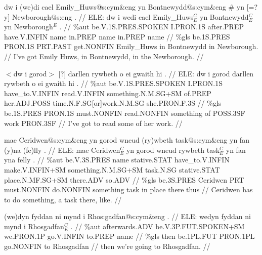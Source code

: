 \documentclass[a4paper,10pt]{article}
\begin{document}
\ex
\begingl[lingstyle=gergl]
\glchat dw i (we)di cael Emily\_Huws@s:cym\&eng yn Bontnewydd@s:cym\&eng \# yn [=? y] Newborough@s:eng . //
\glsurface ELE:  dw i wedi cael Emily\_Huws$^{C}_{E}$ yn Bontnewydd$^{C}_{E}$ yn Newborough$^{E}$ .  //
\glauto \%aut  be{\scriptsize .V.1S.PRES.SPOKEN} I{\scriptsize .PRON.1S} after{\scriptsize .PREP} have{\scriptsize .V.INFIN} name in{\scriptsize .PREP} name in{\scriptsize .PREP} name   //
\glmanual \%gls  be{\scriptsize .1S.PRES} PRON{\scriptsize .1S} PRT{\scriptsize .PAST} get{\scriptsize .NONFIN} Emily\_Huws in Bontnewydd in Newborough{\scriptsize .}   //
\gleng I've got Emily Huws, in Bontnewydd, in the Newborough. //
\endgl
\xe

\ex
\begingl[lingstyle=gergl]
\glchat $<$dw i gorod$>$ [?] darllen rywbeth o ei gwaith hi . //
\glsurface ELE:  dw i gorod darllen rywbeth o ei gwaith hi .  //
\glauto \%aut  be{\scriptsize .V.1S.PRES.SPOKEN} I{\scriptsize .PRON.1S} have\_to{\scriptsize .V.INFIN} read{\scriptsize .V.INFIN} something{\scriptsize .N.M.SG+SM} of{\scriptsize .PREP} her{\scriptsize .ADJ.POSS} time{\scriptsize .N.F.SG[or]work.N.M.SG} she{\scriptsize .PRON.F.3S}   //
\glmanual \%gls  be{\scriptsize .1S.PRES} PRON{\scriptsize .1S} must{\scriptsize .NONFIN} read{\scriptsize .NONFIN} something of POSS{\scriptsize .3SF} work PRON{\scriptsize .3SF}   //
\gleng I've got to read some of her work. //
\endgl
\xe

\ex
\begingl[lingstyle=gergl]
\glchat mae Ceridwen@s:cym\&eng yn gorod wneud (ry)wbeth task@s:cym\&eng yn fan (y)na (fe)lly . //
\glsurface ELE:  mae Ceridwen$^{C}_{E}$ yn gorod wneud rywbeth task$^{C}_{E}$ yn fan yna felly .  //
\glauto \%aut  be{\scriptsize .V.3S.PRES} name stative{\scriptsize .STAT} have\_to{\scriptsize .V.INFIN} make{\scriptsize .V.INFIN+SM} something{\scriptsize .N.M.SG+SM} task{\scriptsize .N.SG} stative{\scriptsize .STAT} place{\scriptsize .N.MF.SG+SM} there{\scriptsize .ADV} so{\scriptsize .ADV}   //
\glmanual \%gls  be{\scriptsize .3S.PRES} Ceridwen PRT must{\scriptsize .NONFIN} do{\scriptsize .NONFIN} something task in place there thus   //
\gleng Ceridwen has to do something, a task there, like. //
\endgl
\xe

\ex
\begingl[lingstyle=gergl]
\glchat (we)dyn fyddan ni mynd i Rhos:gadfan@s:cym\&eng . //
\glsurface ELE:  wedyn fyddan ni mynd i Rhosgadfan$^{C}_{E}$ .  //
\glauto \%aut  afterwards{\scriptsize .ADV} be{\scriptsize .V.3P.FUT.SPOKEN+SM} we{\scriptsize .PRON.1P} go{\scriptsize .V.INFIN} to{\scriptsize .PREP} name   //
\glmanual \%gls  then be{\scriptsize .1PL.FUT} PRON{\scriptsize .1PL} go{\scriptsize .NONFIN} to Rhosgadfan   //
\gleng then we're going to Rhosgadfan. //
\endgl
\xe
\end{document}
